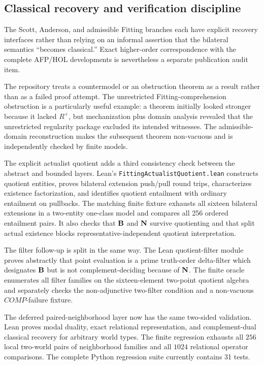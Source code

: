 \subsection{Classical recovery and verification discipline}
\label{sec:verification-discipline}

The Scott, Anderson, and admissible Fitting branches each have explicit recovery interfaces rather than relying on an informal assertion that the bilateral semantics ``becomes classical.'' Exact higher-order correspondence with the complete AFP/HOL developments is nevertheless a separate publication audit item.

The repository treats a countermodel or an obstruction theorem as a result rather than as a failed proof attempt. The unrestricted Fitting-comprehension obstruction is a particularly useful example: a theorem initially looked stronger because it lacked \(R^+\), but mechanization plus domain analysis revealed that the unrestricted regularity package excluded its intended witnesses. The admissible-domain reconstruction makes the subsequent theorem non-vacuous and is independently checked by finite models.

The explicit actualist quotient adds a third consistency check between the abstract and bounded layers. Lean's \texttt{FittingActualistQuotient.lean} constructs quotient entities, proves bilateral extension push/pull round trips, characterizes existence factorization, and identifies quotient entailment with ordinary entailment on pullbacks. The matching finite fixture exhausts all sixteen bilateral extensions in a two-entity one-class model and compares all 256 ordered entailment pairs. It also checks that \(\mathbf{B}\) and \(\mathbf{N}\) survive quotienting and that split actual existence blocks representative-independent quotient interpretation.

The filter follow-up is split in the same way. The Lean quotient-filter module proves abstractly that point evaluation is a prime truth-order delta-filter which designates \(\mathbf{B}\) but is not complement-deciding because of \(\mathbf{N}\). The finite oracle enumerates all filter families on the sixteen-element two-point quotient algebra and separately checks the non-adjunctive two-filter condition and a non-vacuous \(COMP\)-failure fixture.

The deferred paired-neighborhood layer now has the same two-sided validation. Lean proves modal duality, exact relational representation, and complement-dual classical recovery for arbitrary world types. The finite regression exhausts all \(256\) local two-world pairs of neighborhood families and all \(1024\) relational operator comparisons. The complete Python regression suite currently contains 31 tests.

